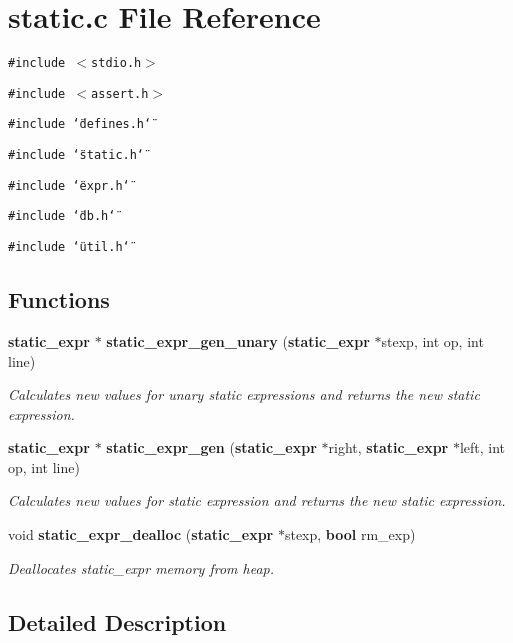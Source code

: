 \section{static.c File Reference}
\label{static_8c}
{\tt \#include $<$stdio.h$>$}\par
{\tt \#include $<$assert.h$>$}\par
{\tt \#include \char`\"{}defines.h\char`\"{}}\par
{\tt \#include \char`\"{}static.h\char`\"{}}\par
{\tt \#include \char`\"{}expr.h\char`\"{}}\par
{\tt \#include \char`\"{}db.h\char`\"{}}\par
{\tt \#include \char`\"{}util.h\char`\"{}}\par
\subsection*{Functions}
\begin{CompactItemize}
\item 
{\bf static\_\-expr} $\ast$ {\bf static\_\-expr\_\-gen\_\-unary} ({\bf static\_\-expr} $\ast$stexp, int op, int line)
\begin{CompactList}\small\item\em Calculates new values for unary static expressions and returns the new static expression.\item\end{CompactList}\item 
{\bf static\_\-expr} $\ast$ {\bf static\_\-expr\_\-gen} ({\bf static\_\-expr} $\ast$right, {\bf static\_\-expr} $\ast$left, int op, int line)
\begin{CompactList}\small\item\em Calculates new values for static expression and returns the new static expression.\item\end{CompactList}\item 
void {\bf static\_\-expr\_\-dealloc} ({\bf static\_\-expr} $\ast$stexp, {\bf bool} rm\_\-exp)
\begin{CompactList}\small\item\em Deallocates static\_\-expr memory from heap.\item\end{CompactList}\end{CompactItemize}


\subsection{Detailed Description}


